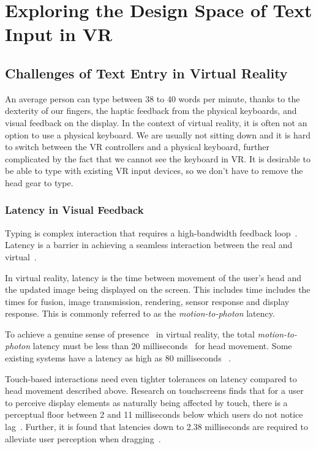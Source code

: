 \section{Exploring the Design Space of Text Input in VR}

\subsection{Challenges of Text Entry in Virtual Reality}

An average person can type between 38 to 40 words per minute, thanks to the dexterity of our fingers, the haptic feedback from the physical keyboards, and visual feedback on the display.    In the context of virtual reality, it is often not an option to use a physical keyboard.  We are usually not sitting down and it is hard to switch between the VR controllers and a physical keyboard, further complicated by the fact that we cannot see the keyboard in VR. It is desirable to be able to type with existing VR input devices, so we don’t have to remove the head gear to type. 

\subsubsection{Latency in Visual Feedback}
Typing is complex interaction that requires a high-bandwidth feedback loop~\cite{McGill:2015:DRO:2702123.2702382}.
Latency is a barrier in achieving a seamless interaction between the real and virtual~\cite{leedesigning}.

In virtual reality, latency is the time between movement of the user's head and the updated image being displayed on the screen.  
This includes time includes the times for fusion, image transmission,
rendering, sensor response and display response.
This is commonly referred to as the \textit{motion-to-photon} latency.

To achieve a genuine sense of presence~\cite{schuemie2001research} in virtual reality, the total \textit{motion-to-photon} latency must be less than 20 milliseconds~\cite{jerald2009relating,jerald2010scene,bailey2004latency} for head movement.
Some existing systems have a latency as high as 80 milliseconds ~\cite{lincoln2016motion,dallaire2016animated}.

Touch-based interactions need even tighter tolerances on latency compared to head movement described above.
Research on touchscreens finds that for a user to perceive display elements as naturally being affected by touch, there is a perceptual floor between 2  and 11 milliseconds below which users do not notice lag~\cite{Jota:2013:FFE:2470654.2481317,Ng:2012:DLD:2380116.2380174}.
Further, it is found that latencies down to 2.38 milliseconds are required to alleviate user perception when dragging~\cite{Jota:2013:FFE:2470654.2481317,Ng:2012:DLD:2380116.2380174}.

